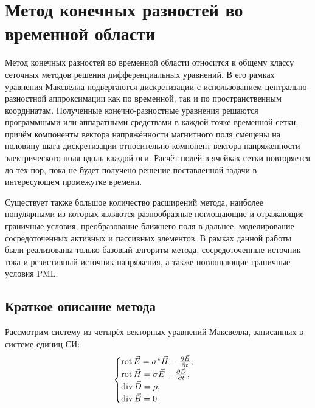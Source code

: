 \section{Метод конечных разностей во временной области}

Метод конечных разностей во временной области относится к общему классу сеточных методов решения дифференциальных уравнений. В его рамках уравнения Максвелла подвергаются дискретизации с использованием центрально-разностной аппроксимации как по временной, так и по пространственным координатам. Полученные конечно-разностные уравнения решаются программными или аппаратными средствами в каждой точке временной сетки, причём компоненты вектора напряжённости магнитного поля смещены на половину шага дискретизации относительно компонент вектора напряженности электрического поля вдоль каждой оси. Расчёт полей в ячейках сетки повторяется до тех пор, пока не будет получено решение поставленной задачи в интересующем промежутке времени.


Существует также большое количество расширений метода, наиболее популярными из которых являются разнообразные поглощающие и отражающие граничные условия, 
преобразование ближнего поля в дальнее, моделирование сосредоточенных активных и пассивных элементов. В рамках данной работы были реализованы только базовый алгоритм метода, сосредоточенные источник тока и резистивный источник напряжения, а также поглощающие граничные условия PML.

\subsection{Краткое описание метода}

Рассмотрим систему из четырёх векторных уравнений Максвелла, записанных в системе единиц СИ:
\begin{equation}
    \label{eq:MaxwellEquations}
	\begin{cases}
		\operatorname{rot}\vec{E} = \sigma^{*}\vec{H}-\frac{\partial {\vec{B}}}{\partial {t}}, \\
		\operatorname{rot}\vec{H} = \sigma\vec{E}+\frac{\partial {\vec{D}}}{\partial {t}}, \\
		\operatorname{div}\vec{D} = \rho, \\
		\operatorname{div}\vec{B} = 0.
	\end{cases}
\end{equation}

